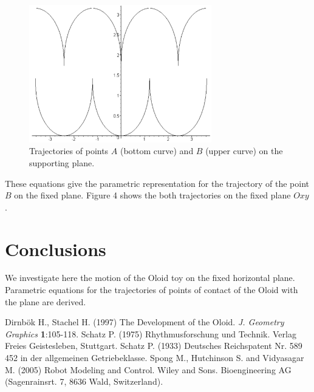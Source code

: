 \documentclass[10pt]{enoc2011}
\begin{document}
\begin{figure}[h]
\centering\includegraphics[height=6cm]{Oloid3}
\caption{Trajectories of points $A$ (bottom curve) and $B$ (upper curve) on the supporting plane.}
\end{figure}

These equations give the parametric representation for the trajectory of the point $B$ on the fixed plane. Figure 4 shows the both trajectories on the fixed plane $Oxy$.

\section{Conclusions}
We investigate here the motion of the Oloid toy on the fixed horizontal plane. Parametric equations for the trajectories of points of contact of the Oloid with the plane are derived.

\begin{thebibliography}{99}
 Dirnb\"ok H., Stachel H. (1997) The Development of the Oloid.  {\em J. Geometry Graphics}
{\bf 1}:105-118.
 Schatz P. (1975) Rhythmusforschung und Technik. Verlag Freies Geistesleben, Stuttgart.
 Schatz P. (1933) Deutsches Reichspatent Nr. 589 452 in der allgemeinen Getriebeklasse.
 Spong M., Hutchinson S. and Vidyasagar M. (2005) Robot Modeling and Control. Wiley and Sons.
 Bioengineering AG (Sagenrainsrt. 7, 8636 Wald, Switzerland).
\end{thebibliography}
\end{document}
